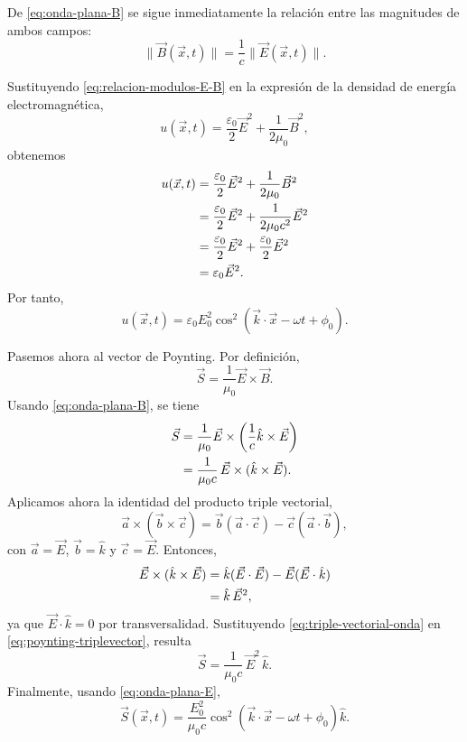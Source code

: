 \documentclass[12pt,a4paper]{article}
\theoremstyle{definition}
\theoremstyle{plain}
\numberwithin{equation}{section}
\theoremstyle{remark}
\newcommand{\E}{\vec{E}}
\newcommand{\B}{\vec{B}}
\begin{document}
De \eqref{eq:onda-plana-B} se sigue inmediatamente la relación entre las magnitudes de ambos campos:
\begin{equation}
    \|\B(\vec x,t)\|=\frac{1}{c}\|\E(\vec x,t)\|.
    \label{eq:relacion-modulos-E-B}
\end{equation}

Sustituyendo \eqref{eq:relacion-modulos-E-B} en la expresión de la densidad de energía electromagnética,
\begin{equation*}
    u(\vec x,t)=\frac{\varepsilon_0}{2}\E^2+\frac{1}{2\mu_0}\B^2,
\end{equation*}
obtenemos
\begin{align}
    u(\vec x,t)
    &=\frac{\varepsilon_0}{2}\E^2+\frac{1}{2\mu_0}\B^2 \notag\\
    &=\frac{\varepsilon_0}{2}\E^2+\frac{1}{2\mu_0 c^2}\E^2 \notag\\
    &=\frac{\varepsilon_0}{2}\E^2+\frac{\varepsilon_0}{2}\E^2 \notag\\
    &=\varepsilon_0\E^2.
    \label{eq:u-onda-plana}
\end{align}
Por tanto,
\begin{equation*}
    u(\vec x,t)=\varepsilon_0 E_0^2\cos^2\!\left(\vec k\cdot\vec x-\omega t+\phi_0\right).
\end{equation*}

Pasemos ahora al vector de Poynting. Por definición,
\begin{equation*}
    \vec S=\frac{1}{\mu_0}\E\times\B.
\end{equation*}
Usando \eqref{eq:onda-plana-B}, se tiene
\begin{align}
    \vec S
    &=\frac{1}{\mu_0}\E\times\left(\frac{1}{c}\hat k\times\E\right) \notag\\
    &=\frac{1}{\mu_0 c}\,\E\times(\hat k\times\E).
    \label{eq:poynting-triplevector}
\end{align}
Aplicamos ahora la identidad del producto triple vectorial,
\begin{equation*}
    \vec a\times(\vec b\times\vec c)=\vec b(\vec a\cdot\vec c)-\vec c(\vec a\cdot\vec b),
\end{equation*}
con \(\vec a=\E\), \(\vec b=\hat k\) y \(\vec c=\E\). Entonces,
\begin{align}
    \E\times(\hat k\times\E)
    &=\hat k(\E\cdot\E)-\E(\E\cdot\hat k) \notag\\
    &=\hat k\,\E^2,
    \label{eq:triple-vectorial-onda}
\end{align}
ya que \(\E\cdot\hat k=0\) por transversalidad. Sustituyendo \eqref{eq:triple-vectorial-onda} en \eqref{eq:poynting-triplevector}, resulta
\begin{equation}
    \vec S=\frac{1}{\mu_0 c}\,\E^2\,\hat k.
    \label{eq:poynting-onda-plana}
\end{equation}
Finalmente, usando \eqref{eq:onda-plana-E},
\begin{equation}
    \vec S(\vec x,t)
    =
    \frac{E_0^2}{\mu_0 c}
    \cos^2\!\left(\vec k\cdot\vec x-\omega t+\phi_0\right)\hat k.
    \label{eq:poynting-onda-plana-explicita}
\end{equation}
\end{document}
